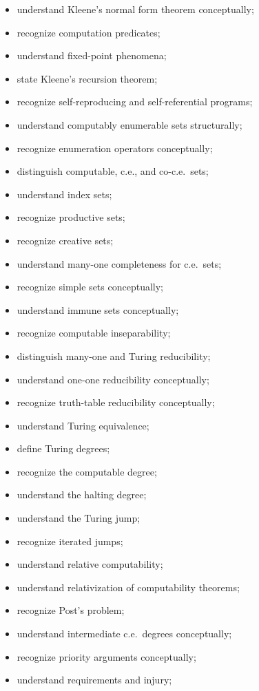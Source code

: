 {\begin{itemize}
    \item understand Kleene's normal form theorem conceptually;
    \item recognize computation predicates;
    \item understand fixed-point phenomena;
    \item state Kleene's recursion theorem;
    \item recognize self-reproducing and self-referential programs;
    \item understand computably enumerable sets structurally;
    \item recognize enumeration operators conceptually;
    \item distinguish computable, c.e., and co-c.e.\ sets;
    \item understand index sets;
    \item recognize productive sets;
    \item recognize creative sets;
    \item understand many-one completeness for c.e.\ sets;
    \item recognize simple sets conceptually;
    \item understand immune sets conceptually;
    \item recognize computable inseparability;
    \item distinguish many-one and Turing reducibility;
    \item understand one-one reducibility conceptually;
    \item recognize truth-table reducibility conceptually;
    \item understand Turing equivalence;
    \item define Turing degrees;
    \item recognize the computable degree;
    \item understand the halting degree;
    \item understand the Turing jump;
    \item recognize iterated jumps;
    \item understand relative computability;
    \item understand relativization of computability theorems;
    \item recognize Post's problem;
    \item understand intermediate c.e.\ degrees conceptually;
    \item recognize priority arguments conceptually;
    \item understand requirements and injury;

\end{itemize}}

